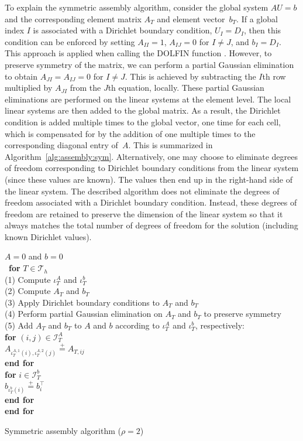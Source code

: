 To explain the symmetric assembly algorithm, consider the global
system $AU=b$ and the corresponding element matrix $A_T$ and element
vector~$b_T$. If a global index $I$ is associated with a Dirichlet
boundary condition, $U_I=D_I$, then this condition can be enforced by
setting $A_{II} = 1$, $A_{IJ} = 0$ for $I \neq J$, and $b_I =
D_I$. This approach is applied when calling the DOLFIN function
. However, to preserve symmetry of the matrix,
we can perform a partial Gaussian elimination to obtain $A_{JI} =
A_{IJ} = 0$ for $I \ne J$. This is achieved by subtracting the $I$th
row multiplied by $A_{JI}$ from the $J$th equation, locally. These
partial Gaussian eliminations are performed on the linear systems at
the element level. The local linear systems are then added to the
global matrix. As a result, the Dirichlet condition is added multiple
times to the global vector, one time for each cell, which is
compensated for by the addition of one multiple times to the
corresponding diagonal entry of~$A$. This is summarized in
Algorithm~\ref{alg:assembly:sym}. Alternatively, one may choose to
eliminate degrees of freedom corresponding to Dirichlet boundary
conditions from the linear system (since these values are known). The
values then end up in the right-hand side of the linear system. The
described algorithm does not eliminate the degrees of freedom
associated with a Dirichlet boundary condition. Instead, these degrees
of freedom are retained to preserve the dimension of the linear system
so that it always matches the total number of degrees of freedom for
the solution (including known Dirichlet values).

\begin{algorithm}
  \begin{tabbing}
    $A = 0$ and $b = 0$\\\
    \textbf{for}  {$T \in \mathcal{T}_h$}\\
    \tab (1) Compute $\iota^A_T$ and $\iota^b_T$  \\
    \tab (2) Compute $A_T$ and $b_T$ \\
    \tab (3) Apply Dirichlet boundary conditions to $A_T$ and $b_T$ \\
    \tab (4) Perform partial Gaussian elimination on $A_T$ and $b_T$ to preserve symmetry \\
    \tab (5) Add $A_T$ and $b_T$ to $A$ and $b$ according to $\iota^A_T$ and $\iota^b_T$, respectively: \\
    \tab \textbf{for} $(i,j) \in \mathcal{I}^A_T$ \\
    \tab \tab $A_{\iota^{A,1}_T(i), \iota^{A,2}_T(j)} \stackrel{+}{=} A_{T,ij}$ \\
    \tab \textbf{end for} \\
    \tab \textbf{for} $i \in \mathcal{I}^b_T$  \\
    \tab \tab $b_{\iota^b_T(i)} \stackrel{+}{=} b^{\top}_i$  \\
    \tab \textbf{end for} \\
    \textbf{end for}
  \end{tabbing}
  \caption{Symmetric assembly algorithm ($\rho = 2$)}
  \label{alg:assembly:sym}
\end{algorithm}


